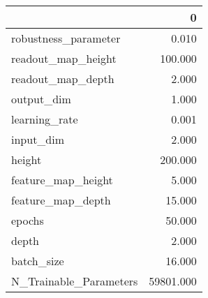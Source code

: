 \begin{tabular}{lr}
\toprule
{} &          0 \\
\midrule
robustness\_parameter   &      0.010 \\
readout\_map\_height     &    100.000 \\
readout\_map\_depth      &      2.000 \\
output\_dim             &      1.000 \\
learning\_rate          &      0.001 \\
input\_dim              &      2.000 \\
height                 &    200.000 \\
feature\_map\_height     &      5.000 \\
feature\_map\_depth      &     15.000 \\
epochs                 &     50.000 \\
depth                  &      2.000 \\
batch\_size             &     16.000 \\
N\_Trainable\_Parameters &  59801.000 \\
\bottomrule
\end{tabular}
